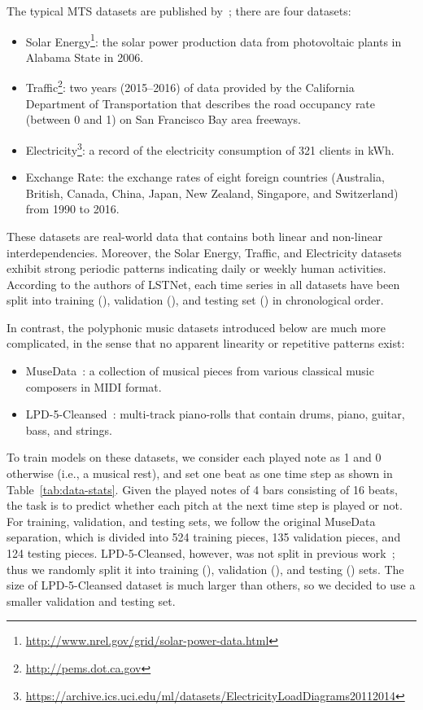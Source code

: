 The typical MTS datasets are published by~\cite{LSTNet}; there are four datasets:
\begin{itemize}
    \item Solar Energy\footnote{\scriptsize \url{http://www.nrel.gov/grid/solar-power-data.html}}: the solar power production data from photovoltaic plants in Alabama State in 2006.
    \item Traffic\footnote{\scriptsize \url{http://pems.dot.ca.gov}}: two years (2015--2016) of data provided by the California Department of Transportation that describes the road occupancy rate (between 0 and 1) on San Francisco Bay area freeways.
    \item Electricity\footnote{\scriptsize \url{https://archive.ics.uci.edu/ml/datasets/ElectricityLoadDiagrams20112014}}: a record of the electricity consumption of 321 clients in kWh.
    \item Exchange Rate: the exchange rates of eight foreign countries (Australia, British, Canada, China, Japan, New Zealand, Singapore, and Switzerland) from 1990 to 2016.
\end{itemize}
These datasets are real-world data that contains both linear and non-linear interdependencies.
Moreover, the Solar Energy, Traffic, and Electricity datasets exhibit strong periodic patterns indicating daily or weekly human activities.
According to the authors of LSTNet, each time series in all datasets have been split into training (), validation (), and testing set () in chronological order.

In contrast, the polyphonic music datasets introduced below are much more complicated, in the sense that no apparent linearity or repetitive patterns exist:
\begin{itemize}
    \item MuseData~\cite{musedata}: a collection of musical pieces from various classical music composers in MIDI format. \item LPD-5-Cleansed~\cite{musegan_0,musegan_1}:  multi-track piano-rolls that contain drums, piano, guitar, bass, and strings.
\end{itemize}
To train models on these datasets, we consider each played note as 1 and 0 otherwise (i.e., a musical rest), and set one beat as one time step as shown in Table~\ref{tab:data-stats}.
Given the played notes of 4 bars consisting of 16 beats, the task is to predict whether each pitch at the next time step is played or not.
For training, validation, and testing sets, we follow the original MuseData separation, which is divided into 524 training pieces, 135 validation pieces, and 124 testing pieces.
LPD-5-Cleansed, however, was not split in previous work~\cite{musegan_0,musegan_1}; thus we randomly split it into training (), validation (), and testing () sets.
The size of LPD-5-Cleansed dataset is much larger than others, so we decided to use a smaller validation and testing set.

